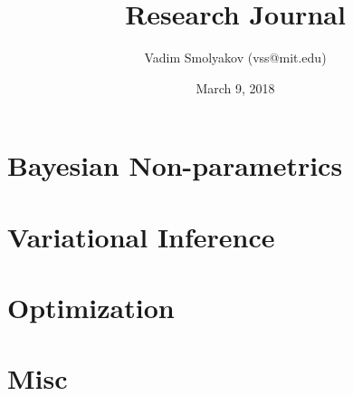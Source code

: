 \documentclass[11pt,a4paper]{article}
\begin{document}
\title{Research Journal}
\date{March 9, 2018}
\author{Vadim Smolyakov (vss@mit.edu)}
\maketitle

%

\section{Bayesian Non-parametrics}


\section{Variational Inference}


\section{Optimization}


\section{Misc}


%



\end{document}
